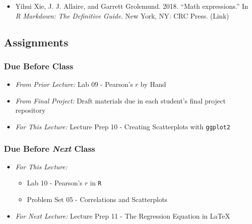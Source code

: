 \documentclass[]{book}
\providecommand{\tightlist}{%
  \setlength{\itemsep}{0pt}\setlength{\parskip}{0pt}}
\theoremstyle{definition}
\theoremstyle{definition}
\theoremstyle{definition}
\theoremstyle{remark}
\begin{document}
\begin{itemize}
\tightlist
\item
  Yihui Xie, J. J. Allaire, and Garrett Grolemund. 2018. ``Math
  expressions.'' In \emph{R Markdown: The Definitive Guide.} New York,
  NY: CRC Press. (Link)
\end{itemize}

\hypertarget{assignments-12}{%
\subsection*{Assignments}\label{assignments-12}}

\hypertarget{due-before-class-10}{%
\subsubsection*{Due Before Class}\label{due-before-class-10}}

\begin{itemize}
\tightlist
\item
  \emph{From Prior Lecture:} Lab 09 - Pearson's \(r\) by Hand
\item
  \emph{From Final Project:} Draft materials due in each student's final
  project repository
\item
  \emph{For This Lecture:} Lecture Prep 10 - Creating Scatterplots with
  \texttt{ggplot2}
\end{itemize}

\hypertarget{due-before-next-class-10}{%
\subsubsection*{\texorpdfstring{Due Before \emph{Next}
Class}{Due Before Next Class}}\label{due-before-next-class-10}}

\begin{itemize}
\tightlist
\item
  \emph{For This Lecture:}

  \begin{itemize}
  \tightlist
  \item
    Lab 10 - Pearson's \(r\) in \texttt{R}
  \item
    Problem Set 05 - Correlations and Scatterplots
  \end{itemize}
\item
  \emph{For Next Lecture:} Lecture Prep 11 - The Regression Equation in
  LaTeX
\end{itemize}
\end{document}

